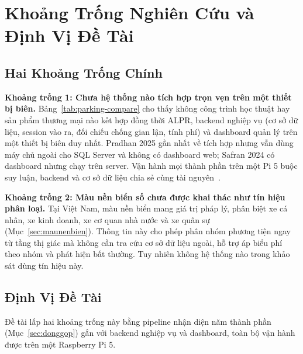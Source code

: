 \section{Khoảng Trống Nghiên Cứu và Định Vị Đề Tài}

\subsection{Hai Khoảng Trống Chính}

\textbf{Khoảng trống 1: Chưa hệ thống nào tích hợp trọn vẹn trên một thiết bị biên.}
Bảng~\ref{tab:parking-compare} cho thấy không công trình học thuật hay sản phẩm thương mại
nào kết hợp đồng thời ALPR, backend nghiệp vụ (cơ sở dữ liệu, session vào ra, đối chiếu
chống gian lận, tính phí) và dashboard quản lý trên một thiết bị biên duy nhất. Pradhan
2025 gần nhất về tích hợp nhưng vẫn dùng máy chủ ngoài cho SQL Server và không có dashboard
web; Safran 2024 có dashboard nhưng chạy trên server. Vận hành mọi thành phần trên một Pi
5 buộc suy luận, backend và cơ sở dữ liệu chia sẻ cùng tài
nguyên~\autocite{pradhan2025iotparking,ammar2023multistage}.

\textbf{Khoảng trống 2: Màu nền biển số chưa được khai thác như tín hiệu phân loại.} Tại
Việt Nam, màu nền biển mang giá trị pháp lý, phân biệt xe cá nhân, xe kinh doanh, xe cơ
quan nhà nước và xe quân sự (Mục~\ref{sec:maunenbien}). Thông tin này cho phép phân nhóm phương
tiện ngay từ tầng thị giác mà không cần tra cứu cơ sở dữ liệu ngoài, hỗ trợ áp biểu phí
theo nhóm và phát hiện bất thường. Tuy nhiên không hệ thống nào trong khảo sát dùng tín
hiệu này.

\subsection{Định Vị Đề Tài}

Đề tài lấp hai khoảng trống này bằng pipeline nhận diện năm thành phần
(Mục~\ref{sec:donggop}) gắn với backend nghiệp vụ và dashboard, toàn bộ vận hành được trên
một Raspberry Pi 5.
